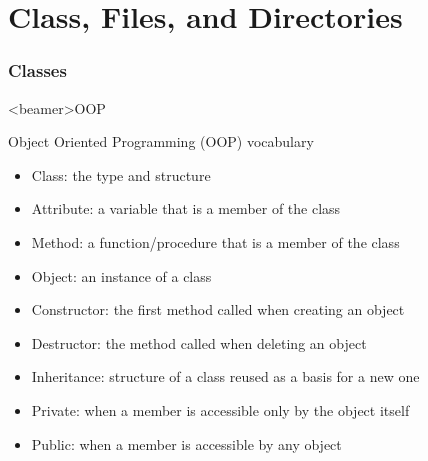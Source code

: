 
\part{Class, Files, and Directories}  %



\section{Classes}

\begin{frame}<beamer>{OOP}

  Object Oriented Programming (OOP) vocabulary

  \begin{itemize}
    \item<2-> Class: the type and structure
    \item<3-> Attribute: a variable that is a member of the class
    \item<4-> Method: a function/procedure that is a member of the class
  \end{itemize}

  \begin{itemize}
    \item<5-> Object: an instance of a class
    \item<6-> Constructor: the first method called when creating an object
    \item<7-> Destructor: the method called when deleting an object
  \end{itemize}

  \begin{itemize}
    \item<8-> Inheritance: structure of a class reused as a basis for a new one
    \item<9-> Private: when a member is accessible only by the object itself
    \item<10-> Public: when a member is accessible by any object
  \end{itemize}

\end{frame}


